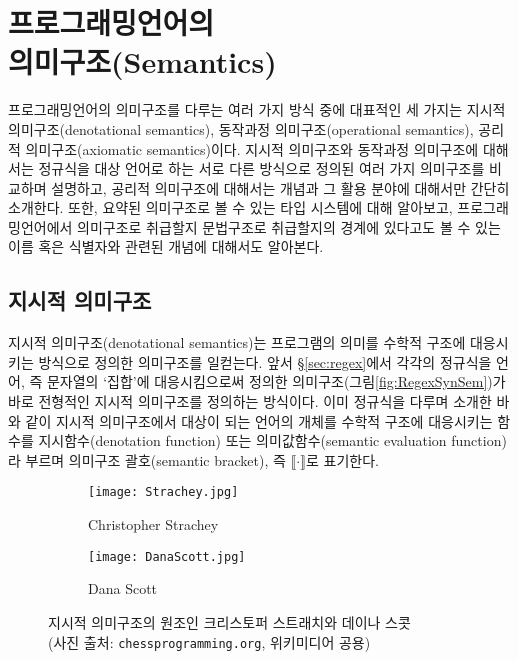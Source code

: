 \chapter[프로그래밍언어의 의미구조(Semantics)]{프로그래밍언어의\\의미구조(Semantics)}

프로그래밍언어의 의미구조를 다루는 여러 가지 방식 중에 대표적인
세 가지는 지시적 의미구조(denotational semantics),
동작과정 의미구조(operational semantics),
공리적 의미구조(axiomatic semantics)이다.
지시적 의미구조와 동작과정 의미구조에 대해서는 정규식을 대상 언어로 하는
서로 다른 방식으로 정의된 여러 가지 의미구조를 비교하며 설명하고,
공리적 의미구조에 대해서는 개념과 그 활용 분야에 대해서만 간단히 소개한다.
또한, 요약된 의미구조로 볼 수 있는 타입 시스템에 대해 알아보고,
프로그래밍언어에서 의미구조로 취급할지 문법구조로 취급할지의 경계에
있다고도 볼 수 있는 이름 혹은 식별자와 관련된 개념에 대해서도 알아본다.

\newpage

\section{지시적 의미구조}
지시적 의미구조(denotational semantics)는 프로그램의 의미를 수학적 구조에
대응시키는 방식으로 정의한 의미구조를 일컫는다. 앞서 \S\ref{sec:regex}에서
각각의 정규식을 언어, 즉 문자열의 `집합'에 대응시킴으로써 정의한 
의미구조(그림\;\ref{fig:RegexSynSem})가 바로 전형적인 지시적 의미구조를
정의하는 방식이다. 이미 정규식을 다루며 소개한 바와 같이 지시적 의미구조에서
대상이 되는 언어의 개체를 수학적 구조에 대응시키는 함수를 지시함수(denotation function)
또는 의미값함수(semantic evaluation function)라 부르며 의미구조 괄호(semantic bracket),
즉 $\llbracket\cdot\rrbracket$로 표기한다.

\begin{figure}\centering
\begin{subfigure}{.3\textwidth}\centering\vspace*{-2ex}
\texttt{[image: Strachey.jpg]}
\caption{Christopher Strachey}
\end{subfigure}
\qquad\qquad
\begin{subfigure}{.3\textwidth}\centering\vspace*{-2ex}
\texttt{[image: DanaScott.jpg]}
\caption{Dana Scott}
\end{subfigure}
\caption{지시적 의미구조의 원조인
         크리스토퍼 스트래치와 데이나 스콧 \\
         {\footnotesize(사진 출처:
              \texttt{chessprogramming.org}, 위키미디어 공용)}
	 \label{fig:StracheyScott} }
\end{figure}


